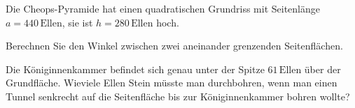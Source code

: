Die Cheops-Pyramide hat einen quadratischen Grundriss mit Seitenlänge
$a=440\,\text{Ellen}$, sie ist $h=280\,\text{Ellen}$ hoch.
\begin{center}
\end{center}
\begin{teilaufgaben}
\item
Berechnen Sie den Winkel zwischen zwei aneinander grenzenden Seitenflächen.
\item
Die Königinnenkammer befindet sich genau unter der Spitze $61\,\text{Ellen}$
über der Grundfläche. Wieviele Ellen Stein müsste man durchbohren, wenn
man einen Tunnel senkrecht auf die Seitenfläche bis zur Königinnenkammer
bohren wollte?
\end{teilaufgaben}


